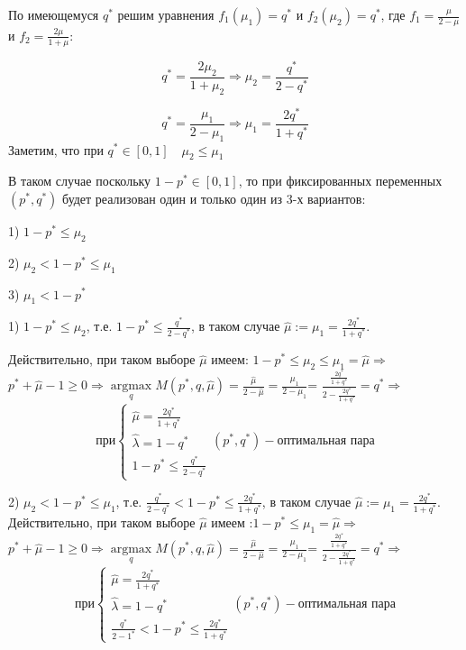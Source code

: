 \documentclass[letterpaper,12pt, reqno]{article}
\DeclareMathOperator*{\argmax}{argmax} %
\begin{document}
\begin{flushleft}

По имеющемуся $q^{*}$ решим уравнения $f_1(\mu_1)=q^{*}$ и $f_2(\mu_2)=q^{*}$, где
$f_1=\frac{\mu}{2-\mu}$ и $f_2=\frac{2\mu}{1+\mu}$:

$$q^{*}=\frac{2\mu_2}{1+\mu_2} \Rightarrow \mu_2=\frac{q^{*}}{2-q^{*}}$$

$$q^{*}=\frac{\mu_1}{2-\mu_1} \Rightarrow \mu_1=\frac{2q^{*}}{1+q^{*}}$$
Заметим, что при $q^{*} \in [0, 1] \quad \mu_2 \leq \mu_1$ 

В таком случае поскольку $1-p^{*} \in [0, 1]$, то при фиксированных переменных 
$(p^{*}, q^{*})$ будет реализован один и только один из 3-х вариантов:

1) $1-p^{*} \leq \mu_2$
  
2) $\mu_2 < 1-p^{*} \leq \mu_1$

3) $\mu_1 < 1-p^{*}$
\vspace{5mm}

1) $1-p^{*} \leq \mu_2$, т.е.  $1-p^{*} \leq \frac{q^{*}}{2-q^{*}}$, в таком случае
$\hat{\mu}:=\mu_1=\frac{2q^{*}}{1+q^{*}}$.

Действительно, при таком выборе $\hat{\mu}$ имеем:  $1-p^{*} \leq \mu_2 \leq \mu_1 = \hat{\mu} \Rightarrow$
$p^{*}+\hat{\mu}-1 \geq 0 \Rightarrow \argmax\limits_{q}M(p^{*},q,\hat{\mu})=
\frac{\hat{\mu}}{2-\hat{\mu}}=\frac{\mu_1}{2-\mu_1}$=
$\frac{\frac{2q^{*}}{1+q^{*}}}{2-\frac{2q^{*}}{1+q^{*}}}=q^{*} \Rightarrow$ 
\[
\textrm{при}
\begin{cases}
\hat{\mu}=\frac{2q^{*}}{1+q^{*}} \\
\hat{\lambda} = 1 - q^{*} \\
1-p^{*} \leq \frac{q^{*}}{2-q^{*}}
\end{cases}
(p^{*}, q^{*}) - \textrm{оптимальная пара}
\] 

2) $\mu_2 < 1-p^{*} \leq \mu_1$, т.е.  $\frac{q^{*}}{2-q^{*}} < 1-p^{*} \leq \frac{2q^{*}}{1+q^{*}}$,
в таком случае $\hat{\mu}:=\mu_1=\frac{2q^{*}}{1+q^{*}}$.
Действительно, при таком выборе $\hat{\mu}$ имеем :$1-p^{*} \leq \mu_1 = \hat{\mu} \Rightarrow$
$p^{*}+\hat{\mu}-1 \geq 0 \Rightarrow \argmax\limits_{q}M(p^{*},q,\hat{\mu})=
\frac{\hat{\mu}}{2-\hat{\mu}}=\frac{\mu_1}{2-\mu_1}$=
$\frac{\frac{2q^{*}}{1+q^{*}}}{2-\frac{2q^{*}}{1+q^{*}}}=q^{*} \Rightarrow$ 
\[
\textrm{при}
\begin{cases}
\hat{\mu}=\frac{2q^{*}}{1+q^{*}} \\
\hat{\lambda} = 1 - q^{*} \\
\frac{q^{*}}{2-1^{*}} < 1-p^{*} \leq \frac{2q^{*}}{1+q^{*}}
\end{cases}
(p^{*}, q^{*}) - \textrm{оптимальная пара}
\] 


\end{flushleft}
\end{document}
